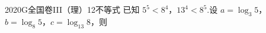 
\begin{problem}{2020}{G}{全国卷III（理）}{12}{不等式}
已知 $ 5^5 < 8^4 $，$ 13^4 < 8^5 $.设 $ a = \log_3 5 $，$ b = \log_8 5 $，$ c = \log_{13} 8 $，则
\begin{choices}
\end{choices}
\end{problem}

\begin{answer}

\end{answer}

\begin{solutions}

\end{solutions}